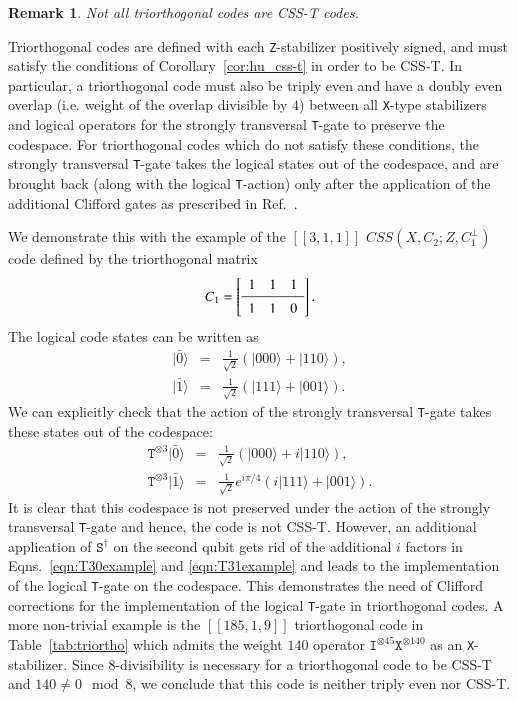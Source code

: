 \documentclass[journal]{IEEEtran}
\newcommand{\T}{\texttt{T}}
\newcommand{\X}{\texttt{X}}
\newcommand{\Z}{\texttt{Z}}
\newtheorem{remark}{Remark}[theorem]
\begin{document}
\begin{remark}
    Not all triorthogonal codes are CSS-T codes.
\end{remark}

Triorthogonal codes are defined with each \Z-stabilizer positively signed, and must satisfy the conditions of Corollary~\ref{cor:hu_css-t} in order to be CSS-T. In particular, a triorthogonal code must also be triply even and have a doubly even overlap (i.e. weight of the overlap divisible by $4$) between all \X-type stabilizers and logical operators for the strongly transversal \T-gate to preserve the codespace. For triorthogonal codes which do not satisfy these conditions, the strongly transversal \T-gate takes the logical states out of the codespace, and are brought back (along with the logical \T-action) only after the application of the additional Clifford gates as prescribed in Ref.~\cite{bravyi_magic-state_2012}. 

We demonstrate this with the example of the $[[3,1,1]]$ $CSS(X,C_2;Z,C_1^\perp)$ code defined by the triorthogonal matrix
\begin{equation}
    C_1 = \left[\begin{array}{ccc}
   1 & 1 & 1  \\
   \midrule
   1 & 1 & 0\\
\end{array}\right] .
\end{equation} 
The logical code states can be written as
\begin{eqnarray}
    |\bar{0}\rangle &=& \frac{1}{\sqrt{2}}\left(|000\rangle+|110\rangle\right), \\
    |\bar{1}\rangle &=& \frac{1}{\sqrt{2}}\left(|111\rangle+|001\rangle\right).
\end{eqnarray}
We can explicitly check that the action of the strongly transversal \T-gate takes these states out of the codespace:
\begin{eqnarray}
    \texttt{T}^{\otimes3}|\bar{0}\rangle &=& \frac{1}{\sqrt{2}}\left(|000\rangle+i|110\rangle\right),\label{eqn:T30example} \\
    \texttt{T}^{\otimes3}|\bar{1}\rangle &=& \frac{1}{\sqrt{2}}e^{i\pi/4}\left(i|111\rangle+|001\rangle\right). \label{eqn:T31example}
\end{eqnarray}
It is clear that this codespace is not preserved under the action of the strongly transversal \T-gate and hence, the code is not CSS-T. However, an additional application of $\texttt{S}^\dagger$ on the second qubit gets rid of the additional $i$ factors in Eqns.~\ref{eqn:T30example} and \ref{eqn:T31example} and leads to the implementation of the logical \T-gate on the codespace. This demonstrates the need of Clifford corrections for the implementation of the logical \T-gate in triorthogonal codes. A more non-trivial example is the $[[185,1,9]]$ triorthogonal code in Table~\ref{tab:triortho} which admits the weight $140$ operator $\texttt{I}^{\otimes 45}\texttt{X}^{\otimes 140}$ as an \X-stabilizer. Since $8$-divisibility is necessary for a triorthogonal code to be CSS-T and $140 \neq 0\mod{8}$, we conclude that this code is neither triply even nor CSS-T.
\end{document}
